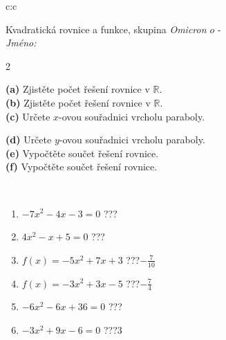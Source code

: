 \documentclass[10pt]{report}
\newcommand\omicron{o}
\begin{document}
\begin{tabular}{c:c}
\begin{minipage}[c][104.5mm][t]{0.5\linewidth}
\begin{center}
\vspace{7mm}
{\huge \LARGE Kvadratická rovnice a funkce, skupina \textit{Omicron $\omicron$} -}\\[5mm]
\textit{Jméno:}\phantom{xxxxxxxxxxxxxxxxxxxxxxxxxxxxxxxxxxxxxxxxxxxxxxxxxxxxxxxxxxxxxxxxx}\\[5mm]
\begin{minipage}{0.95\linewidth}
\begin{center}
{\small \begin{multicols}{2} \raggedright
\textbf{(a)} Zjistěte počet řešení rovnice v \(\mathbb{R}\). \\[1mm]
\textbf{(b)} Zjistěte počet řešení rovnice v \(\mathbb{R}\). \\[1mm]
\textbf{(c)} Určete \(x\)-ovou souřadnici vrcholu paraboly. \par \columnbreak
\textbf{(d)} Určete \(y\)-ovou souřadnici vrcholu paraboly. \\[1mm]
\textbf{(e)} Vypočtěte součet řešení rovnice. \\[1mm]
\textbf{(f)} Vypočtěte součet řešení rovnice.
\end{multicols}
}
\end{center}
\end{minipage}
\\[4mm]
\begin{minipage}{0.79\linewidth}
\begin{center}
\begin{varwidth}{\linewidth}
\begin{enumerate}
\Large
\item $-7x^2-4x-3=0$\quad \dotfill\; ???\;\dotfill {}
\item $4x^2-x+5=0$\quad \dotfill\; ???\;\dotfill {}
\item $f(x)=-5x^2+7x+3$\quad \dotfill\; ???\;\dotfill \quad $-\frac{7}{10}$
\item $f(x)=-3x^2+3x-5$\quad \dotfill\; ???\;\dotfill \quad $-\frac{7}{4}$
\item $-6x^2-6x+36=0$\quad \dotfill\; ???\;\dotfill {}
\item $-3x^2+9x-6=0$\quad \dotfill\; ???\;\dotfill \quad $3$
\end{enumerate}
\end{varwidth}
\end{center}

\end{minipage}
\end{center}
\end{minipage}
\end{tabular}
\end{document}
